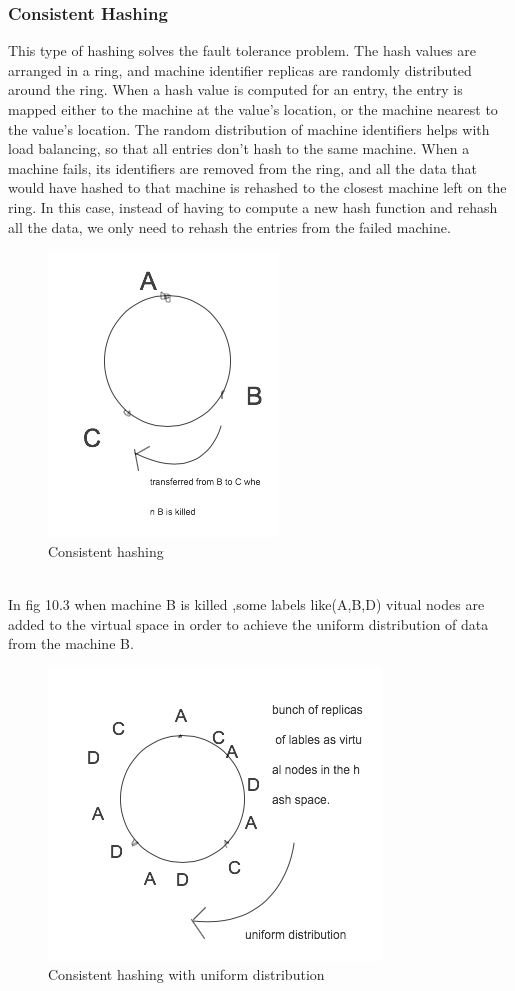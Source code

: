 \documentclass[twoside]{article}
\begin{document}
\subsubsection{Consistent Hashing}
This type of hashing solves the fault tolerance problem. The hash values are arranged in a ring, and machine identifier replicas are randomly distributed around the ring. When a hash value is computed for an entry, the entry is mapped either to the machine at the value's location, or the machine nearest to the value's location. The random distribution of machine identifiers helps with load balancing, so that all entries don't hash to the same machine. When a machine fails, its identifiers are removed from the ring, and all the data that would have hashed to that machine is rehashed to the closest machine left on the ring. In this case, instead of having to compute a new hash function and rehash all the data, we only need to rehash the entries from the failed machine.\\
\begin{figure}[h]
\centering
\includegraphics[width=0.5\linewidth]{fig2}
\caption[]{Consistent hashing}
\label{cpl}
\end{figure}\\
 In fig 10.3 when machine B is killed ,some labels like(A,B,D) vitual nodes are added to the virtual space in order to achieve the uniform distribution of data from the machine B.
\begin{figure}[h]
\centering
\includegraphics[width=0.5\linewidth]{fig3}
\caption[]{Consistent hashing with uniform distribution}
\label{cpl}
\end{figure}\\
\end{document}
